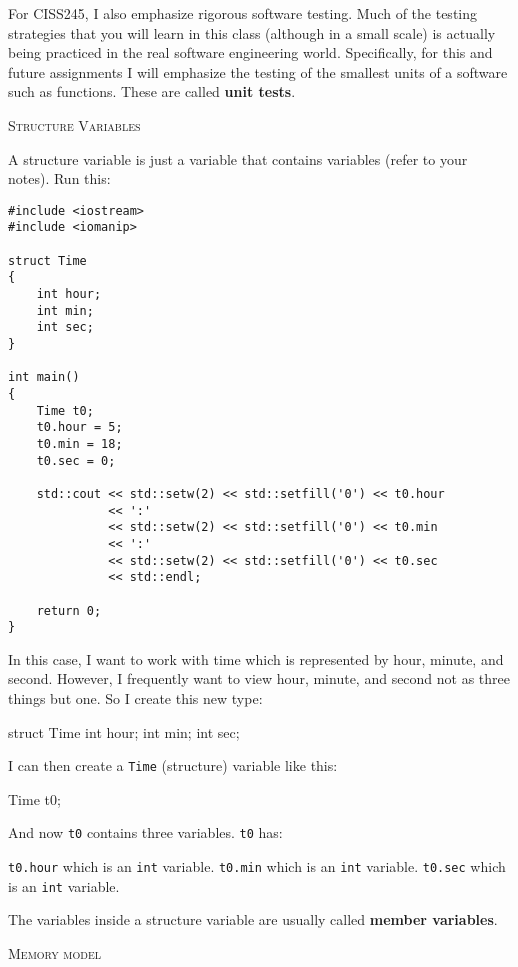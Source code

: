 
For CISS245, I also emphasize rigorous software testing. Much of the testing
strategies that you will learn in this class (although in a small scale) is
actually being practiced in the real software engineering world. Specifically,
for this and future assignments I will emphasize the testing of the smallest
units of a software such as functions. These are called \textbf{unit tests}.


\newpage
\textsc{Structure Variables}

A structure variable is just a variable that contains variables (refer to your
notes). Run this:
\begin{Verbatim}[frame=single,fontsize=\small]
#include <iostream>
#include <iomanip>

struct Time
{
    int hour;
    int min;
    int sec;
}

int main()
{
    Time t0;
    t0.hour = 5;
    t0.min = 18;
    t0.sec = 0;

    std::cout << std::setw(2) << std::setfill('0') << t0.hour
              << ':'
              << std::setw(2) << std::setfill('0') << t0.min
              << ':'
              << std::setw(2) << std::setfill('0') << t0.sec
              << std::endl;

    return 0;
}
\end{Verbatim}

In this case, I want to work with time which is represented by hour, minute,
and second. However, I frequently want to view hour, minute, and second not as
three things but one. So I create this new type:
\begin{console}[fontsize=\small]
struct Time
{
    int hour;
    int min;
    int sec;
}
\end{console}

I can then create a \verb!Time! (structure) variable like this:
\begin{console}[fontsize=\small]
Time t0;
\end{console}

And now \verb!t0! contains three variables. \verb!t0! has:
\begin{tightlist}
  \li \verb!t0.hour! which is an \verb!int! variable.
  \li \verb!t0.min! which is an \verb!int! variable.
  \li \verb!t0.sec! which is an \verb!int! variable.
\end{tightlist}

The variables inside a structure variable are usually called
\textbf{member variables}.

\textsc{Memory model}

